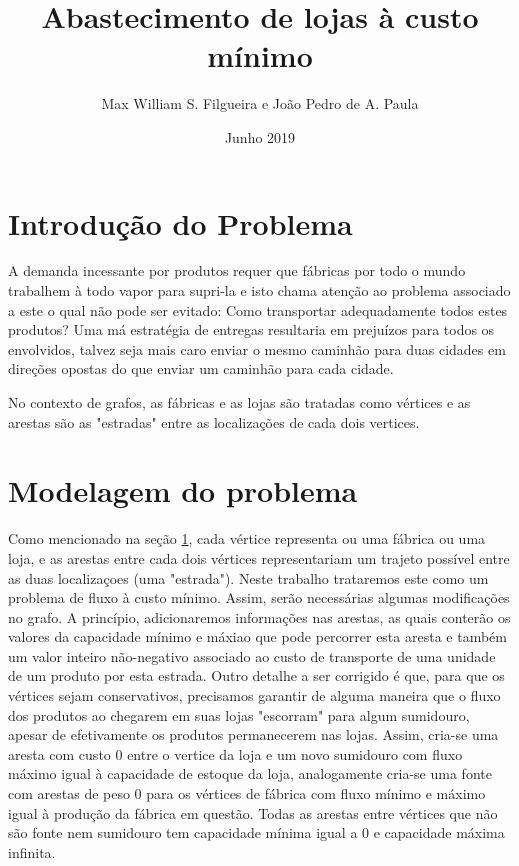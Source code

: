 \documentclass[12pt, a4]{article}
\title{Abastecimento de lojas à custo mínimo}
\author{Max William S. Filgueira e João Pedro de A. Paula}
\date{Junho 2019}
\begin{document}
\maketitle

\tableofcontents

\newpage

\section{Introdução do Problema}
\label{sec:intro}

A demanda incessante por produtos requer que fábricas por todo o mundo trabalhem
à todo vapor para supri-la e isto chama atenção ao problema associado a este o
qual não pode ser evitado: Como transportar adequadamente todos estes produtos?
Uma má estratégia de entregas resultaria em prejuízos para todos os envolvidos,
talvez seja mais caro enviar o mesmo caminhão para duas cidades em direções
opostas do que enviar um caminhão para cada cidade.

No contexto de grafos, as fábricas e as lojas são tratadas como vértices e as
arestas são as "estradas" entre as localizações de cada dois vertices.

\section{Modelagem do problema}
\label{sec:modelling}

Como mencionado na seção \ref{sec:intro}, cada vértice representa ou uma fábrica
ou uma loja, e as arestas entre cada dois vértices representariam um trajeto
possível entre as duas localizaçoes (uma "estrada"). Neste trabalho trataremos
este como um problema de fluxo à custo mínimo. Assim, serão necessárias algumas
modificações no grafo. A princípio, adicionaremos informações nas arestas, as
quais conterão os valores da capacidade mínimo e máxiao que pode percorrer esta
aresta e também um valor inteiro não-negativo associado ao custo de transporte
de uma unidade de um produto por esta estrada. Outro detalhe a ser corrigido é
que, para que os vértices sejam conservativos, precisamos garantir de alguma
maneira que o fluxo dos produtos ao chegarem em suas lojas "escorram" para algum
sumidouro, apesar de efetivamente os produtos permanecerem nas lojas. Assim,
cria-se uma aresta com custo 0 entre o vertice da loja e um novo sumidouro com
fluxo máximo igual à capacidade de estoque da loja, analogamente cria-se uma
fonte com arestas de peso 0 para os vértices de fábrica com fluxo mínimo e
máximo igual à produção da fábrica em questão. Todas as arestas entre vértices
que não são fonte nem sumidouro tem capacidade mínima igual a 0 e capacidade
máxima infinita.
\end{document}
